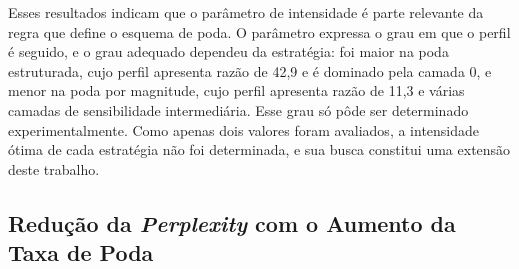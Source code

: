 Esses resultados indicam que o parâmetro de intensidade é parte relevante da regra que define o
esquema de poda. O parâmetro expressa o grau em que o perfil é seguido, e o grau adequado
dependeu da estratégia: foi maior na poda estruturada, cujo perfil apresenta razão de 42,9 e é
dominado pela camada 0, e menor na poda por magnitude, cujo perfil apresenta razão de 11,3 e
várias camadas de sensibilidade intermediária. Esse grau só pôde ser determinado
experimentalmente. Como apenas dois valores foram avaliados, a intensidade ótima de cada
estratégia não foi determinada, e sua busca constitui uma extensão deste trabalho.

\subsection{Redução da \textit{Perplexity} com o Aumento da Taxa de
Poda}\label{subsec:reducao_ppl}


